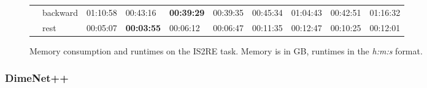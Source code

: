 \begin{figure}[H]
{\begin{tabular}{ll|l|l|l|l|l|l|l|l|}
    \multicolumn{1}{|l|}{}                          & backward    & 01:10:58 & 00:43:16          & \textbf{00:39:29} & 00:39:35       & 00:45:34 & 01:04:43       & 00:42:51          & 01:16:32    \\ \cline{2-10} 
    \multicolumn{1}{|l|}{}                          & rest        & 00:05:07 & \textbf{00:03:55} & 00:06:12          & 00:06:47       & 00:11:35 & 00:12:47       & 00:10:25          & 00:12:01    \\ \hline
    \end{tabular}}

    \captionsetup{width=\dimexpr\textwidth-1.5cm\relax}
    \caption{Memory consumption and runtimes on the IS2RE task. 
    Memory is in GB, runtimes in the \textit{h:m:s} format.
    }
    \label{fig:gemnet-is2re}
    
\end{figure}

\subsubsection{DimeNet++}

